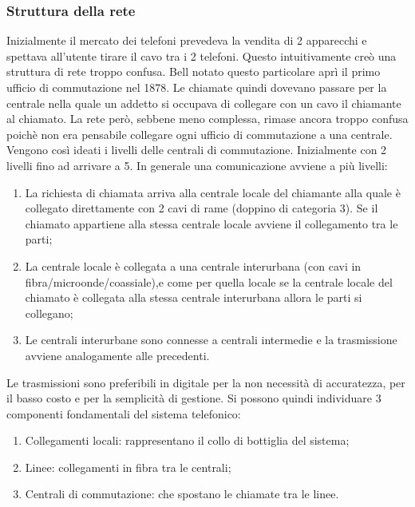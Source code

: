\subsubsection{Struttura della rete}

Inizialmente il mercato dei telefoni prevedeva la vendita di 2 apparecchi e spettava all'utente tirare il cavo tra i 2 telefoni. Questo intuitivamente creò una struttura di rete troppo confusa. Bell notato questo particolare aprì il primo ufficio di commutazione nel 1878. Le chiamate quindi dovevano passare per la centrale nella quale un addetto si occupava di collegare con un cavo il chiamante al chiamato. La rete però, sebbene meno complessa, rimase ancora troppo confusa poichè non era pensabile collegare ogni ufficio di commutazione a una centrale. Vengono così ideati i livelli delle centrali di commutazione. Inizialmente con 2 livelli fino ad arrivare a 5. In generale una comunicazione avviene a più livelli:

\begin{enumerate}

\item{La richiesta di chiamata arriva alla centrale locale del chiamante alla quale è collegato direttamente con 2 cavi di rame (doppino di categoria 3). Se il chiamato appartiene alla stessa centrale locale avviene il collegamento tra le parti};
\item{La centrale locale è collegata a una centrale interurbana (con cavi in fibra/microonde/coassiale),e come per quella locale se la centrale locale del chiamato è collegata alla stessa centrale interurbana allora le parti si collegano};
\item{Le centrali interurbane sono connesse a centrali intermedie e la trasmissione avviene analogamente alle precedenti}.

\end{enumerate}

Le trasmissioni sono preferibili in digitale per la non necessità di accuratezza, per il basso costo e per la semplicità di gestione.
Si possono quindi individuare 3 componenti fondamentali del sistema telefonico:

\begin{enumerate}

\item{Collegamenti locali: rappresentano il collo di bottiglia del sistema};
\item{Linee: collegamenti in fibra tra le centrali};
\item{Centrali di commutazione: che spostano le chiamate tra le linee}.

\end{enumerate}

